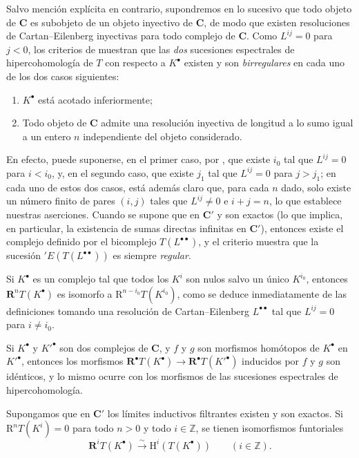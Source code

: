\begin{env}[11.4.4]
\label{0.11.4.4-fr}
Salvo mención explícita en contrario, supondremos en lo sucesivo que todo objeto de $\boldsymbol{C}$ es subobjeto de un objeto inyectivo de $\boldsymbol{C}$, de modo que existen resoluciones de Cartan--Eilenberg inyectivas para todo complejo de $\boldsymbol{C}$.
Como $L^{ij}=0$ para $j<0$, los criterios de  muestran que las \emph{dos} sucesiones espectrales de hipercohomología de $T$ con respecto a $K^\bullet$ existen y son \emph{birregulares} en cada uno de los dos casos siguientes:
\begin{enumerate}
  \item[$1^\circ$] $K^\bullet$ está acotado inferiormente;
  \item[$2^\circ$] Todo objeto de $\boldsymbol{C}$ admite una resolución inyectiva de longitud a lo sumo igual a un entero $n$ independiente del objeto considerado.
\end{enumerate}
En efecto, puede suponerse, en el primer caso, por , que existe $i_0$ tal que $L^{ij}=0$ para $i<i_0$, y, en el segundo caso, que existe $j_1$ tal que $L^{ij}=0$ para $j>j_1$;
en cada uno de estos dos casos, está además claro que, para cada $n$ dado, solo existe un número finito de pares $(i,j)$ tales que $L^{ij}\neq0$ e $i+j=n$, lo que establece nuestras aserciones. Cuando se supone que en $\boldsymbol{C}'$ y son exactos (lo que implica, en particular, la existencia de sumas directas infinitas en $\boldsymbol{C}'$), entonces existe el complejo definido por el bicomplejo $T(L^{\bullet\bullet})$, y el criterio  muestra que la sucesión $'E(T(L^{\bullet\bullet}))$ es siempre \emph{regular}.

Si $K^\bullet$ es un complejo tal que todos los $K^i$ son nulos salvo un único $K^{i_0}$, entonces
$\mathbf R^nT(K^\bullet)$ es isomorfo a $\mathrm R^{n-i_0}T(K^{i_0})$, como se deduce inmediatamente de las definiciones tomando una resolución de Cartan--Eilenberg $L^{\bullet\bullet}$ tal que $L^{ij}=0$ para $i\neq i_0$.

Si $K^\bullet$ y $K'^\bullet$ son dos complejos de $\boldsymbol{C}$, y $f$ y $g$ son morfismos homótopos de $K^\bullet$ en $K'^\bullet$, entonces los morfismos $\mathbf R^\bullet T(K^\bullet)\to
\mathbf R^\bullet T(K'^\bullet)$ inducidos por $f$ y $g$ son idénticos, y lo mismo ocurre con los morfismos de las sucesiones espectrales de hipercohomología.
\end{env}

\begin{proposition}[11.4.5]
\label{0.11.4.5-fr}
Supongamos que en $\boldsymbol{C}'$ los límites inductivos filtrantes existen y son exactos. Si $\mathrm R^nT(K^i)=0$ para todo $n>0$ y todo $i\in\mathbb Z$, se tienen isomorfismos funtoriales
\[
  \label{0.11.4.5.1-fr}
  \mathbf R^iT(K^\bullet)\xrightarrow{\sim}
  \mathrm H^i(T(K^\bullet))\qquad(i\in\mathbb Z).
  \tag{11.4.5.1}
\]
\end{proposition}

